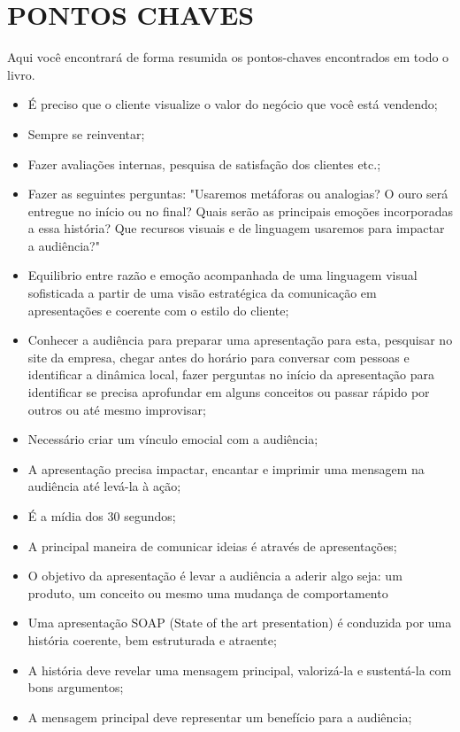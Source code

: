 \chapter{PONTOS CHAVES}
\label{chap:keypoints}

Aqui você encontrará de forma resumida os pontos-chaves encontrados em todo o livro.

\begin{itemize}
    \item É preciso que o cliente visualize o valor do negócio que você está vendendo;
    \item Sempre se reinventar; 
    \item Fazer avaliações internas, pesquisa de satisfação dos clientes etc.;
    \item Fazer as seguintes perguntas: "Usaremos metáforas ou analogias? O ouro será entregue no início ou no final? Quais serão as principais emoções incorporadas a essa história? Que recursos visuais e de linguagem usaremos para impactar a audiência?"
    \item Equilibrio entre razão e emoção acompanhada de uma linguagem visual sofisticada a partir de uma visão estratégica da comunicação em apresentações e coerente com o estilo do cliente;
    \item Conhecer a audiência para preparar uma apresentação para esta, pesquisar no site da empresa, chegar antes do horário para conversar com pessoas e identificar a dinâmica local, fazer perguntas no início da apresentação para identificar se precisa aprofundar em alguns conceitos ou passar rápido por outros ou até mesmo improvisar;
    \item Necessário criar um vínculo emocial com a audiência;
    \item A apresentação precisa impactar, encantar e imprimir uma mensagem na audiência até levá-la à ação;
    \item É a mídia dos 30 segundos;
    \item A principal maneira de comunicar ideias é através de apresentações;
    \item O objetivo da apresentação é levar a audiência a aderir algo seja: um produto, um conceito ou mesmo uma mudança de comportamento
    \item Uma apresentação SOAP (State of the art presentation) é conduzida por uma história coerente, bem estruturada e atraente;
    \item A história deve revelar uma mensagem principal, valorizá-la e sustentá-la com bons argumentos;
    \item A mensagem principal deve representar um benefício para a audiência;

\end{itemize}
